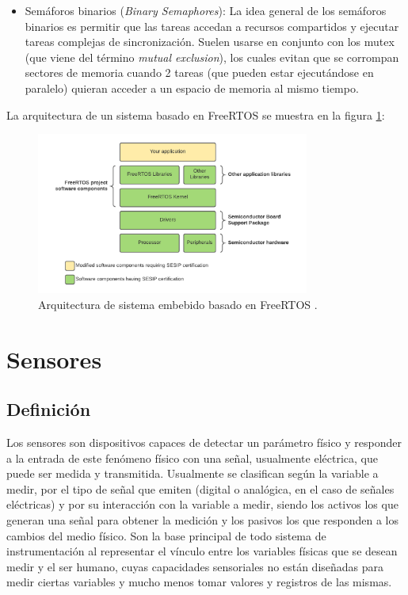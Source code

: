 \begin{itemize}
    \item Semáforos binarios (\textit{Binary Semaphores}): La idea general de los semáforos binarios es permitir que las tareas accedan a recursos compartidos y ejecutar tareas complejas de sincronización. Suelen usarse en conjunto con los mutex (que viene del término \textit{mutual exclusion}), los cuales evitan que se corrompan sectores de memoria cuando 2 tareas (que pueden estar ejecutándose en paralelo) quieran acceder a un espacio de memoria al mismo tiempo.
\end{itemize}

La arquitectura de un sistema basado en FreeRTOS se muestra en la figura \ref{fig:rtos}:

\begin{figure}[H]
    \centering
    \includegraphics[width = 0.8\textwidth]{imagenes/cap1_marcoteo/FreeRTOSArch.png}
    \caption{Arquitectura de sistema embebido basado en FreeRTOS \citep{rtos}.}
    \label{fig:rtos}
\end{figure}

\section{Sensores}

\subsection{Definición}

Los sensores son dispositivos capaces de detectar un parámetro físico y responder a la entrada de este fenómeno físico con una señal, usualmente eléctrica, que puede ser medida y transmitida. Usualmente se clasifican según la variable a medir, por el tipo de señal que emiten (digital o analógica, en el caso de señales eléctricas) y por su interacción con la variable a medir, siendo los activos los que generan una señal para obtener la medición y los pasivos los que responden a los cambios del medio físico. Son la base principal de todo sistema de instrumentación al representar el vínculo entre los variables físicas que se desean medir y el ser humano, cuyas capacidades sensoriales no están diseñadas para medir ciertas variables y mucho menos tomar valores y registros de las mismas.


